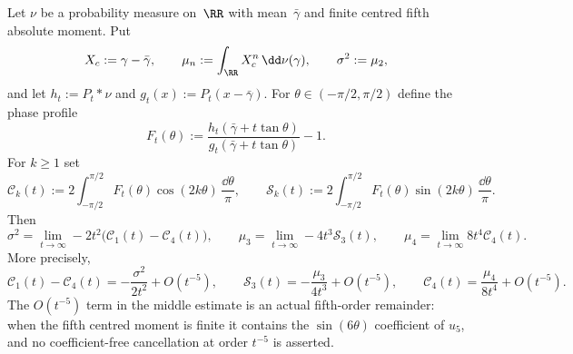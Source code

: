 \begin{proposition}%
\label{prop:poisson-cauchy-moment-inversion-by-phase-modes}
Let $\nu$ be a probability measure on~$\RR$ with mean~$\bar{\gamma}$ and
finite centred fifth absolute moment.  Put
\[
X_c:=\gamma-\bar{\gamma},\qquad
\mu_n:=\int_{\RR}X_c^n\,\dd\nu(\gamma),\qquad
\sigma^2:=\mu_2,
\]
and let $h_t:=P_t*\nu$ and $g_t(x):=P_t(x-\bar{\gamma})$.  For
$\theta\in(-\pi/2,\pi/2)$ define the phase profile
\[
F_t(\theta):=
\frac{h_t(\bar{\gamma}+t\tan\theta)}
     {g_t(\bar{\gamma}+t\tan\theta)}-1.
\]
For $k\ge1$ set
\[
\mathcal C_k(t):=
2\int_{-\pi/2}^{\pi/2}F_t(\theta)\cos(2k\theta)\,\frac{\dd\theta}{\pi},
\qquad
\mathcal S_k(t):=
2\int_{-\pi/2}^{\pi/2}F_t(\theta)\sin(2k\theta)\,\frac{\dd\theta}{\pi}.
\]
Then
\[
\sigma^2=\lim_{t\to\infty}-2t^2\bigl(\mathcal C_1(t)-\mathcal C_4(t)\bigr),
\qquad
\mu_3=\lim_{t\to\infty}-4t^3\mathcal S_3(t),
\qquad
\mu_4=\lim_{t\to\infty}8t^4\mathcal C_4(t).
\]
More precisely,
\[
\mathcal C_1(t)-\mathcal C_4(t)
=-\frac{\sigma^2}{2t^2}+O(t^{-5}),\qquad
\mathcal S_3(t)=-\frac{\mu_3}{4t^3}+O(t^{-5}),
\qquad
\mathcal C_4(t)=\frac{\mu_4}{8t^4}+O(t^{-5}).
\]
The $O(t^{-5})$ term in the middle estimate is an actual fifth-order
remainder: when the fifth centred moment is finite it contains the
$\sin(6\theta)$ coefficient of $u_5$, and no coefficient-free cancellation at
order $t^{-5}$ is asserted.
\end{proposition}

